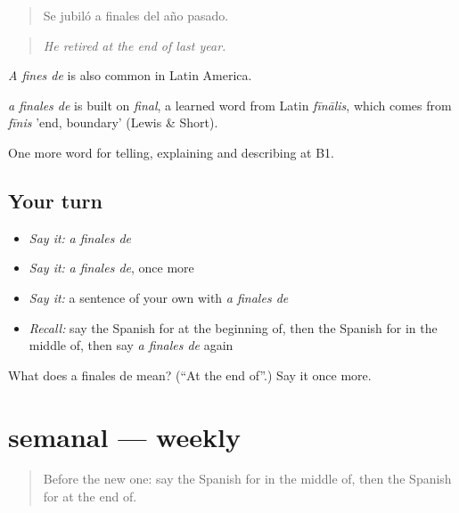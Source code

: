 \begin{quote}
Se jubiló a finales del año pasado.
\end{quote}

\begin{quote}
\emph{He retired at the end of last year.}
\end{quote}

\emph{A fines de} is also common in Latin America.

\begin{cousinweb}
\emph{a finales de} is built on \emph{final}, a learned word from Latin \emph{fīnālis}, which comes from \emph{fīnis} 'end, boundary' (Lewis \& Short).
\end{cousinweb}

\begin{grammarlens}[title={What you've built}]
One more word for telling, explaining and describing at B1.
\end{grammarlens}

\subsection*{Your turn}
\begin{itemize}
\raggedright
  \item \emph{Say it:} \emph{a finales de}
  \item \emph{Say it:} \emph{a finales de}, once more
  \item \emph{Say it:} a sentence of your own with \emph{a finales de}
  \item \emph{Recall:} say the Spanish for at the beginning of, then the Spanish for in the middle of, then say \emph{a finales de} again
\end{itemize}

\begin{tcolorbox}[breakable,colback=teal!4,colframe=teal!35!black,title={Before you move on}]
What does a finales de mean? (\textquotedblleft{}At the end of\textquotedblright{}.) Say it once more.
\end{tcolorbox}
\section[semanal]{semanal — weekly}

\label{lesson:ES-C540-semanal}



\begin{quote}
Before the new one: say the Spanish for in the middle of, then the Spanish for at the end of.
\end{quote}

